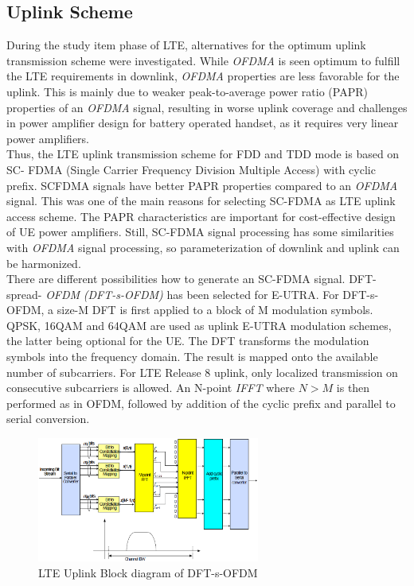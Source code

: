 \subsection{Uplink Scheme}%

 During the study item phase of LTE, alternatives for the optimum uplink
transmission scheme were investigated. While \textit{OFDMA} is seen optimum to fulfill
the LTE requirements in downlink, \textit{OFDMA} properties are less favorable for the
uplink. This is mainly due to weaker peak-to-average power ratio (PAPR)
properties of an \textit{OFDMA} signal, resulting in worse uplink coverage and
challenges in power amplifier design for battery operated handset, as it
requires very linear power amplifiers.\\

Thus, the LTE uplink transmission scheme for FDD and TDD mode is based on SC-
FDMA (Single Carrier Frequency Division Multiple Access) with cyclic prefix.
SCFDMA signals have better PAPR properties compared to an \textit{OFDMA} signal. This was
one of the main reasons for selecting SC-FDMA as LTE uplink access scheme. The
PAPR characteristics are important for cost-effective design of UE power
amplifiers. Still, SC-FDMA signal processing has some similarities with \textit{OFDMA}
signal processing, so parameterization of downlink and uplink can be
harmonized.\\

There are different possibilities how to generate an SC-FDMA signal. DFT-spread-
\textit{OFDM} \textit{(DFT-s-OFDM)} has been selected for E-UTRA. For DFT-s-OFDM, a size-M DFT is
first applied to a block of M modulation symbols. QPSK, 16QAM and 64QAM are used
as uplink E-UTRA modulation schemes, the latter being optional for the UE. The
DFT transforms the modulation symbols into the frequency domain. The result is
mapped onto the available number of subcarriers. For LTE Release 8 uplink, only
localized transmission on consecutive subcarriers is allowed. An N-point \textit{IFFT}
where $N>M$ is then performed as in OFDM, followed by addition of the cyclic
prefix and parallel to serial conversion.

\begin{figure}[htbp]
    \centering
    \includegraphics[width=0.65\textwidth]{./figures/uplink_scheme}
    \caption{ LTE Uplink Block diagram of DFT-s-OFDM
    \label{fig:uplinkbd}}
\end{figure}
